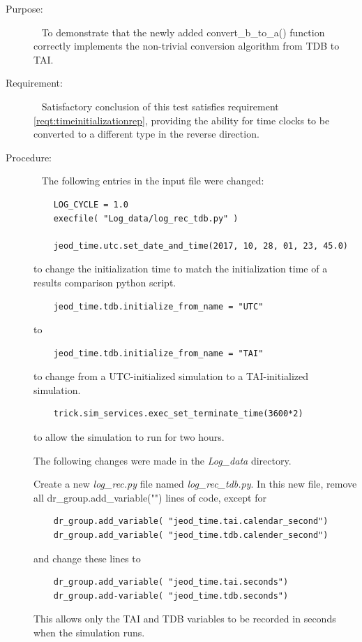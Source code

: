   \label{test:UDEinitbytdb}
\begin{description}
\item[Purpose:]\ \newline
To demonstrate that the newly added convert\_b\_to\_a() function correctly implements the
non-trivial conversion algorithm from TDB to TAI.

\item[Requirement:]\ \newline
Satisfactory conclusion of this test satisfies requirement \ref{reqt:timeinitializationrep},
providing the ability for time clocks to be converted to a different type in the reverse direction.

\item[Procedure:]\ \newline
The following entries in the input file were changed:
\begin{verbatim}
	LOG_CYCLE = 1.0
	execfile( "Log_data/log_rec_tdb.py" )

	jeod_time.utc.set_date_and_time(2017, 10, 28, 01, 23, 45.0)
\end{verbatim}
to change the initialization time to match the initialization time of a results comparison python script.
\begin{verbatim}
	jeod_time.tdb.initialize_from_name = "UTC"
\end{verbatim}
to
\begin{verbatim}
	jeod_time.tdb.initialize_from_name = "TAI"
\end{verbatim}
to change from a UTC-initialized simulation to a TAI-initialized simulation.
\begin{verbatim}
	trick.sim_services.exec_set_terminate_time(3600*2)
\end{verbatim}
to allow the simulation to run for two hours.

The following changes were made in the \textit{Log\_data} directory.

Create a new \textit{log\_rec.py} file named \textit{log\_rec\_tdb.py}. In this new file, remove all dr\_group.add\_variable("") lines of code, except for
\begin{verbatim}
	dr_group.add_variable( "jeod_time.tai.calendar_second")
	dr_group.add_variable( "jeod_time.tdb.calender_second")
\end{verbatim}
and change these lines to
\begin{verbatim}
	dr_group.add_variable( "jeod_time.tai.seconds")
	dr_group.add-variable( "jeod_time.tdb.seconds")
\end{verbatim}
This allows only the TAI and TDB variables to be recorded in seconds when the simulation runs.


\end{description}
